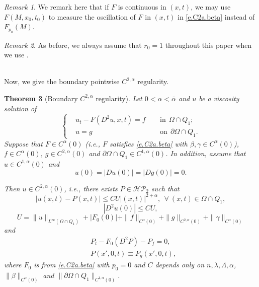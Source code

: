 \documentclass[preprint,12pt]{elsarticle}
\newtheorem{theorem}{Theorem}[section]
\theoremstyle{definition}
\theoremstyle{remark}
\newtheorem{remark}[theorem]{Remark}
\numberwithin{equation}{section}
\begin{document}
\begin{remark}\label{re.ocs.F1}
We remark here that if $F$ is continuous in $(x,t)$, we may use $F(M,x_0,t_0)$ to measure the oscillation of $F$ in $(x,t)$ in \cref{e.C2a.beta} instead of $F_{p_0}(M)$.
\end{remark}

\begin{remark}\label{re.ocs.F2}
As before, we always assume that $r_0=1$ throughout this paper when we use .
\end{remark}
~\\

Now, we give the boundary pointwise $C^{2,\alpha}$ regularity.
\begin{theorem}[Boundary $C^{2,\alpha}$ regularity]\label{C2a-1}
Let $0<\alpha<\bar\alpha$ and $u$ be a viscosity solution of
  \begin{equation}\label{e.C2a.u-1}
\left\{\begin{aligned}
&u_t-F(D^2u,x,t)=f&& ~~\mbox{in}~~\Omega\cap Q_1;\\
&u=g&& ~~\mbox{on}~~\partial \Omega \cap Q_1.
\end{aligned}\right.
\end{equation}
Suppose that $F\in C^{\alpha}(0)$ (i.e., $F$ satisfies \cref{e.C2a.beta} with $\beta,\gamma\in C^{\alpha}(0)$), $f\in C^{\alpha}(0)$, $g\in C^{2,\alpha}(0)$ and $\partial \Omega\cap Q_1 \in C^{1,\alpha}(0)$. In addition, assume that $u\in C^{1,\alpha}(0)$ and
\begin{equation*}
u(0)=|Du(0)|=|Dg(0)|=0.
\end{equation*}

Then $u\in C^{2,\alpha}(0)$, i.e., there exists $P\in \mathcal{HP}_2$ such that
\begin{equation}\label{e.C2a-1}
|u(x,t)-P(x,t)|\leq CU|(x,t)|^{2+\alpha},~~\forall~(x,t)\in \Omega \cap Q_{1},
\end{equation}
\begin{equation}\label{e.C2a.2-1}
|D^2u(0)| \leq CU,
\end{equation}
\begin{equation*}
U=\|u\|_{L^{\infty}(\Omega\cap Q_1)}+|F_0(0)|+
\|f\|_{C^{\alpha}(0)}+\|g\|_{C^{2,\alpha}(0)}
+\|\gamma\|_{C^{\alpha}(0)}
\end{equation*}
and
\begin{equation}\label{e.C2a.3-1}
\begin{aligned}
&P_t-F_0(D^2 P)-P_f=0,\\
&P(x',0,t)\equiv P_g(x',0,t),
\end{aligned}
\end{equation}
where $F_0$ is from \cref{e.C2a.beta} with $p_0=0$ and $C$ depends only on $n, \lambda,\Lambda,\alpha$, $\|\beta\|_{C^{\alpha}(0)}$ and $\|\partial \Omega\cap Q_1\|_{C^{1,\alpha}(0)}$.
\end{theorem}
\end{document}
